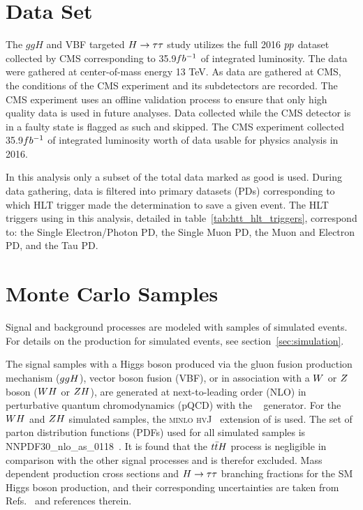 \section{Data Set}
\label{sec:htt_dataset}
The $ggH$ and VBF targeted $H\to\tau\tau$ study utilizes the full 2016 $pp$ dataset collected by CMS corresponding to 35.9$fb^{-1}$ 
of integrated luminosity.  The data were gathered at center-of-mass energy 13 TeV.
As data are gathered at CMS, the conditions of the CMS experiment and its subdetectors are recorded.
The CMS experiment uses an offline validation process to ensure that only high quality
data is used in future analyses.  Data collected while the CMS detector is in a faulty state
is flagged as such and skipped. The CMS experiment collected 35.9$fb^{-1}$ of integrated 
luminosity worth of data usable for physics analysis in 2016.

In this analysis only a subset of the total data marked as good is used.  During data
gathering, data is filtered into primary datasets (PDs) corresponding to which HLT trigger
made the determination to save a given event.  The HLT triggers using in this analysis,
detailed in table~\ref{tab:htt_hlt_triggers}, correspond to: the Single Electron/Photon
PD, the Single Muon PD, the Muon and Electron PD, and the Tau PD.



\section{Monte Carlo Samples}
\label{sec:htt_mc_samples}
Signal and background processes are modeled with samples of simulated events.
For details on the production for simulated events, see section~\ref{sec:simulation}.

The signal samples with a Higgs boson produced via the gluon fusion production
mechanism ($ggH$), vector boson fusion (VBF), or in association with a $W$ or $Z$ boson ($WH$ or $ZH$), 
are generated at next-to-leading order (NLO) in perturbative quantum chromodynamics (pQCD) 
with the ~\cite{Nason:2004rx,Frixione:2007vw, Alioli:2010xd, Alioli:2010xa, Alioli:2008tz} 
generator. For the $WH$ and $ZH$ simulated samples, the \textsc{minlo hvJ}~\cite{Luisoni:2013kna} 
extension of  is used. The set of parton distribution functions (PDFs) used for all
simulated samples is NNPDF30\_nlo\_as\_0118~\cite{Ball:2011uy}. It is found that the $t\bar{t}H$ 
process is negligible in comparison with the other signal processes and is therefor excluded.
Mass dependent production cross sections and $H\to\tau\tau$ branching fractions for the SM Higgs boson production, 
and their corresponding uncertainties are taken from 
Refs.~\cite{deFlorian:2016spz,Denner:2011mq,Ball:2011mu} and references therein.

